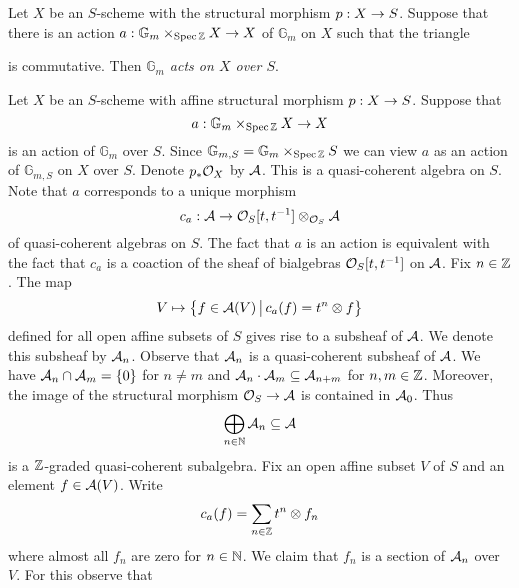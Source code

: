 \begin{definition}
Let $X$ be an $S$-scheme with the structural morphism $p:X\rightarrow S$. Suppose that there is an action $a:\mathbb{G}_{m}\times_{\mathrm{Spec}\, {\mathbb Z}}X\rightarrow X$ of $\mathbb{G}_{m}$ on $X$ such that the triangle
\begin{center}
\end{center}
is commutative. Then \textit{$\mathbb{G}_{m}$ acts on $X$ over $S$}.
\end{definition}
\noindent
Let $X$ be an $S$-scheme with affine structural morphism $p:X\rightarrow S$. Suppose that 
$$a:\mathbb{G}_{m}\times_{\mathrm{Spec}\, {\mathbb Z}}X\rightarrow X$$
is an action of $\mathbb{G}_m$ over $S$. Since $\mathbb{G}_{m,S} = \mathbb{G}_m\times_{\mathrm{Spec}\, {\mathbb Z}}S$ we can view $a$ as an action of $\mathbb{G}_{m,S}$ on $X$ over $S$. Denote $p_*{\mathcal O}_X$ by ${\mathcal A}$. This is a quasi-coherent algebra on $S$. Note that $a$ corresponds to a unique morphism 
$$c_a:{\mathcal A} \rightarrow {\mathcal O}_S[t,t^{-1}]\otimes_{{\mathcal O}_S}{\mathcal A}$$
of quasi-coherent algebras on $S$. The fact that $a$ is an action is equivalent with the fact that $c_a$ is a coaction of the sheaf of bialgebras ${\mathcal O}_S[t,t^{-1}]$ on ${\mathcal A}$. Fix $n\in {\mathbb Z}$. The map
$$V\mapsto \big\{f\in {\mathcal A}(V)\,\big|\,c_a(f) = t^n\otimes f\big\}$$
defined for all open affine subsets of $S$ gives rise to a subsheaf of ${\mathcal A}$. We denote this subsheaf by ${\mathcal A}_n$. Observe that ${\mathcal A}_n$ is a quasi-coherent subsheaf of ${\mathcal A}$. We have ${\mathcal A}_n\cap {\mathcal A}_m = \{0\}$ for $n\neq m$ and ${\mathcal A}_n\cdot {\mathcal A}_m \subseteq {\mathcal A}_{n+m}$ for $n,m\in {\mathbb Z}$. Moreover, the image of the structural morphism ${\mathcal O}_S\rightarrow {\mathcal A}$ is contained in ${\mathcal A}_0$. Thus 
$$\bigoplus_{n\in {\mathbb N}}{\mathcal A}_n \subseteq {\mathcal A}$$
is a ${\mathbb Z}$-graded quasi-coherent subalgebra. Fix an open affine subset $V$ of $S$ and an element $f\in {\mathcal A}(V)$. Write
$$c_a(f) = \sum_{n\in {\mathbb Z}}t^n\otimes f_n$$
where almost all $f_n$ are zero for $n\in {\mathbb N}$. We claim that $f_n$ is a section of ${\mathcal A}_n$ over $V$. For this observe that
